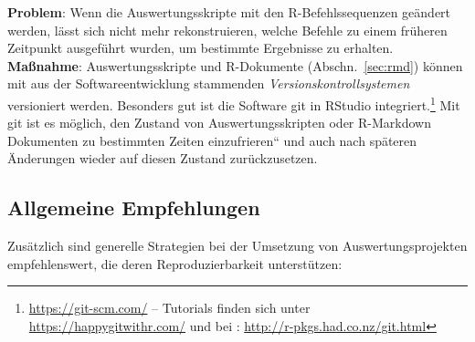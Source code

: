 \textbf{Problem}: Wenn die Auswertungsskripte mit den R-Befehlssequenzen geändert werden, lässt sich nicht mehr rekonstruieren, welche Befehle zu einem früheren Zeitpunkt ausgeführt wurden, um bestimmte Ergebnisse zu erhalten.\\
\textbf{Maßnahme}: Auswertungsskripte und R-Dokumente (Abschn.\ \ref{sec:rmd}) können mit aus der Softwareentwicklung stammenden \emph{Versionskontrollsystemen} versioniert werden. Besonders gut ist die Software git in RStudio integriert.\footnote{\url{https://git-scm.com/} -- Tutorials finden sich unter \url{https://happygitwithr.com/} und bei : \url{http://r-pkgs.had.co.nz/git.html}} Mit git ist es möglich, den Zustand von Auswertungsskripten oder R-Markdown Dokumenten zu bestimmten Zeiten {\quotedblbase}einzufrieren{\textquotedblleft} und auch nach späteren Änderungen wieder auf diesen Zustand zurückzusetzen.

\subsection{Allgemeine Empfehlungen}

Zusätzlich sind generelle Strategien bei der Umsetzung von Auswertungsprojekten empfehlenswert, die deren Reproduzierbarkeit unterstützen:

